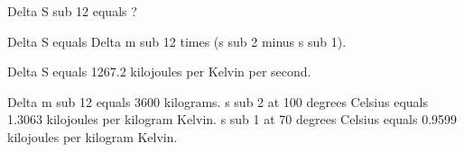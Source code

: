Delta S sub 12 equals ?  

Delta S equals Delta m sub 12 times (s sub 2 minus s sub 1).  

Delta S equals 1267.2 kilojoules per Kelvin per second.  

Delta m sub 12 equals 3600 kilograms.  
s sub 2 at 100 degrees Celsius equals 1.3063 kilojoules per kilogram Kelvin.  
s sub 1 at 70 degrees Celsius equals 0.9599 kilojoules per kilogram Kelvin.